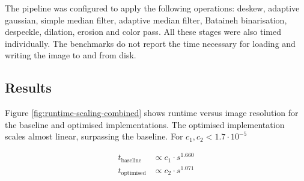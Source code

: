 \documentclass[sigconf]{acmart}
\begin{document}
The pipeline was configured to apply the following operations: deskew, adaptive gaussian, simple median filter, adaptive median filter, Bataineh binarisation, despeckle, dilation, erosion and color pass. All these stages were also timed individually. The benchmarks do not report the time necessary for loading and writing the image to and from disk.

\subsection{Results}
\label{sec:results}

Figure \ref{fig:runtime-scaling-combined} shows runtime versus image resolution for the baseline and optimised implementations. The optimised implementation scales almost linear, surpassing the baseline. For $c_1, c_2 < 1.7 \cdot 10^{-5}$

\begin{align*}
  t_{\text{baseline}} &\propto c_1 \cdot s^{1.660} \\
  t_{\text{optimised}} &\propto c_2 \cdot s^{1.071}
\end{align*}
\end{document}
